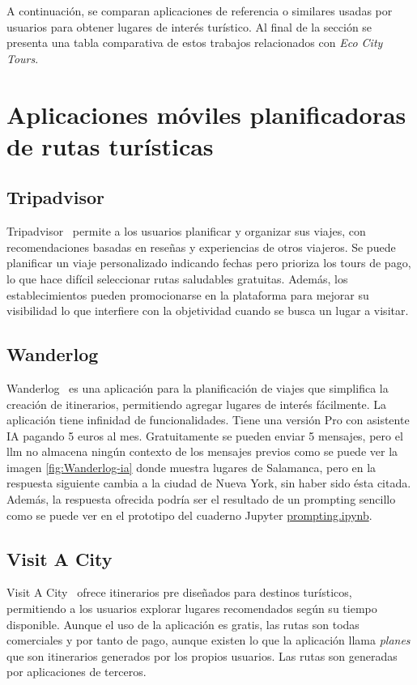 
A continuación, se comparan aplicaciones de referencia o similares usadas por usuarios para obtener lugares de interés turístico. Al final de la sección se presenta una tabla comparativa de estos trabajos relacionados con \textit{Eco City Tours}.
\section{Aplicaciones móviles planificadoras de rutas turísticas}
\subsection{Tripadvisor}
Tripadvisor~\cite{tripadvisor} permite a los usuarios planificar y organizar sus viajes, con recomendaciones basadas en reseñas y experiencias de otros viajeros. Se puede planificar un viaje personalizado indicando fechas pero prioriza los tours de pago, lo que hace difícil seleccionar rutas saludables gratuitas. Además, los establecimientos pueden promocionarse en la plataforma para mejorar su visibilidad lo que interfiere con la objetividad cuando se busca un lugar a visitar.

\subsection{Wanderlog}
Wanderlog~\cite{wanderlog} es una aplicación para la planificación de viajes que simplifica la creación de itinerarios, permitiendo agregar lugares de interés fácilmente. La aplicación tiene infinidad de funcionalidades. Tiene una versión Pro con asistente IA pagando 5 euros al mes. Gratuitamente se pueden enviar 5 mensajes, pero el \acrshort{llm} no almacena ningún contexto de los mensajes previos como se puede ver la imagen \ref{fig:Wanderlog-ia} donde muestra lugares de  Salamanca, pero en la respuesta siguiente cambia a la ciudad de Nueva York, sin haber sido ésta citada. Además, la respuesta ofrecida podría ser el resultado de un prompting sencillo como se puede ver en el prototipo del cuaderno Jupyter \href{https://github.com/fps1001/TFGII_FPisot/tree/main/project-prototypes/prompting.ipynb}{prompting.ipynb}.

\subsection{Visit A City}
Visit A City~\cite{visitacity} ofrece itinerarios pre diseñados para destinos turísticos, permitiendo a los usuarios explorar lugares recomendados según su tiempo disponible. Aunque el uso de la aplicación es gratis, las rutas son todas comerciales y por tanto de pago, aunque existen lo que la aplicación llama \textit{planes} que son itinerarios generados por los propios usuarios. Las rutas son generadas por aplicaciones de terceros.

